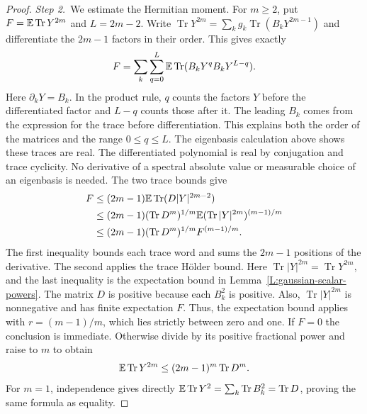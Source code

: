 \begin{proof}
  \medskip
  \noindent\textit{Step 2.~}We estimate the Hermitian moment.
  For $m \ge 2$, put $F = \mathbb{E}\operatorname{Tr}Y^{2m}$ and $L = 2m-2$. Write
  $\operatorname{Tr}Y^{2m} = \sum_k g_k \operatorname{Tr}(B_kY^{2m-1})$ and
  differentiate the $2m-1$ factors in their order. This gives exactly
  \[
    F=\sum_k\sum_{q=0}^{L}
    \mathbb{E}\operatorname{Tr}(B_kY^qB_kY^{L-q}).
  \]
  Here $\partial_kY = B_k$. In the product rule, $q$ counts the factors $Y$
  before the differentiated factor and $L-q$ counts those after it. The
  leading $B_k$ comes from the expression for the trace before
  differentiation. This explains both the order of the matrices and the range
  $0 \le q \le L$.
  The eigenbasis calculation above shows these traces are real. The
  differentiated polynomial is real by conjugation and trace cyclicity. No
  derivative of a spectral absolute value or measurable choice of an eigenbasis
  is needed. The two trace bounds give
  \begin{align*}
    F&\le (2m-1)\mathbb{E}\operatorname{Tr}(D|Y|^{2m-2})\\
    &\le (2m-1)(\operatorname{Tr}D^m)^{1/m}
    \mathbb{E}(\operatorname{Tr}|Y|^{2m})^{(m-1)/m}\\
    &\le (2m-1)(\operatorname{Tr}D^m)^{1/m}F^{(m-1)/m}.
  \end{align*}
  The first inequality bounds each trace word and sums the $2m-1$
  positions of the derivative. The second applies the trace H\"older bound.
  Here $\operatorname{Tr}|Y|^{2m} = \operatorname{Tr}Y^{2m}$, and the last
  inequality is the expectation bound in Lemma~\ref{L:gaussian-scalar-powers}.
  The matrix $D$ is positive because each $B_k^2$ is positive. Also,
  $\operatorname{Tr}|Y|^{2m}$ is nonnegative and has finite expectation $F$.
  Thus, the expectation bound applies with $r = (m-1)/m$, which lies strictly
  between zero and one.
  If $F = 0$ the conclusion is immediate. Otherwise divide by its positive
  fractional power and raise to $m$ to obtain
  \begin{equation}\label{E:finite-hermitian-gaussian}
    \mathbb{E}\operatorname{Tr}Y^{2m} \le (2m-1)^m\operatorname{Tr}D^m.
  \end{equation}
  For $m = 1$, independence gives directly $\mathbb{E}\operatorname{Tr}Y^2 =
  \sum_k\operatorname{Tr}B_k^2 = \operatorname{Tr}D$, proving the same formula
  as equality.



\end{proof}
